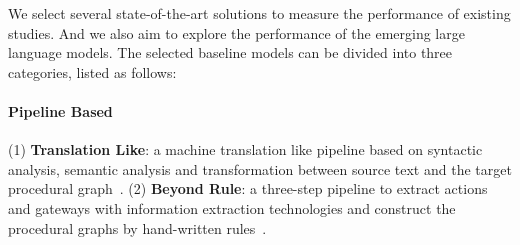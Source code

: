     
    

We select several state-of-the-art solutions to measure the performance of existing studies. And we also aim to explore the performance of the emerging large language models. 
The selected baseline models can be divided into three categories, listed as follows:

\paragraph{Pipeline Based}
(1) \textbf{Translation Like}: a machine translation like pipeline based on syntactic analysis, semantic analysis and transformation between source text and the target procedural graph~\cite{sonbol2023machine}. 
(2) \textbf{Beyond Rule}: a three-step pipeline to extract actions and gateways with information extraction technologies and construct the procedural graphs by hand-written rules~\cite{neuberger2023beyond}. 

